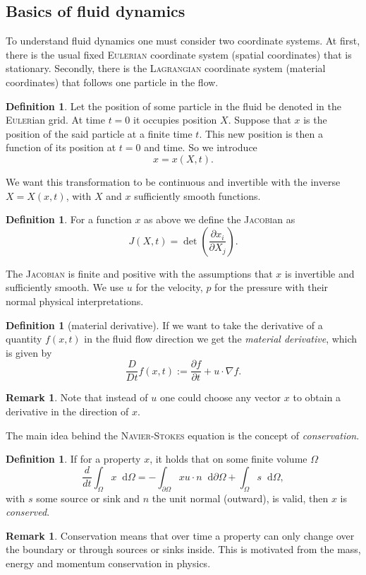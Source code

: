 \documentclass[12pt,a4paper,twoside, open=right]{scrreprt}
\theoremstyle{definition}
\newtheorem{rem}[auf]{Remark}
\newtheorem{defn}[auf]{Definition}
\theoremstyle{plain}
\newcommand{\D}{\mathop{}\!\mathrm{d}}
\begin{document}
\subsection{Basics of fluid dynamics}
To understand fluid dynamics one must consider two coordinate systems. At first, there is the usual fixed \textsc{Eulerian} coordinate system (spatial coordinates) that is stationary. Secondly, there is the \textsc{Lagrangian} coordinate system (material coordinates) that follows one particle in the flow. 
\begin{defn}
    Let the position of some particle in the fluid be denoted in the \textsc{Euler}ian grid. At time $t=0$ it occupies position $X$. Suppose that $x$ is the position of the said particle at a finite time $t$. This new position is then a function of its position at $t=0$ and time. So we introduce
    \begin{equation}
        x=x(X,t).
    \end{equation}
\end{defn}
We want this transformation to be continuous and invertible with the inverse $X=X(x,t)$, with $X$ and $x$ sufficiently smooth functions. 
\begin{defn}
    For a function $x$ as above we define the \textsc{Jacobi}an as
    \begin{equation}
        J(X,t)= \det\left(\frac{\partial x_i}{\partial X_j}\right).
    \end{equation}
\end{defn}
The \textsc{Jacobian} is finite and positive with the assumptions that $x$ is invertible and sufficiently smooth. We use $u$ for the velocity, $p$ for the pressure with their normal physical interpretations.
\begin{defn}[material derivative]
    If we want to take the derivative of a quantity $f(x,t)$ in the fluid flow direction we get the \emph{material derivative}, which is given by 
    \begin{equation}
        \frac{D}{Dt}f(x,t):=\frac{\partial f}{\partial t} + u\cdot\nabla f.
    \end{equation}
\end{defn}
\begin{rem}
    Note that instead of $u$ one could choose any vector $x$ to obtain a derivative in the direction of $x$.
\end{rem}
The main idea behind the \textsc{Navier-Stokes} equation is the concept of \emph{conservation}. 
\begin{defn}
    If for a property $x$, it holds that on some finite volume $\Omega$
    \begin{equation}
        \frac{d}{dt}\int_\Omega x\D\Omega = -\int_{\partial\Omega}xu\cdot n\D\partial\Omega+\int_\Omega s\D\Omega,\label{eq:conservation}
    \end{equation}
   with $s$ some source or sink and $n$ the unit normal (outward), is valid, then $x$ is \emph{conserved}.
\end{defn}
\begin{rem}
    Conservation means that over time a property can only change over the boundary or through sources or sinks inside. This is motivated from the mass, energy and momentum conservation in physics.
\end{rem}
\end{document}
